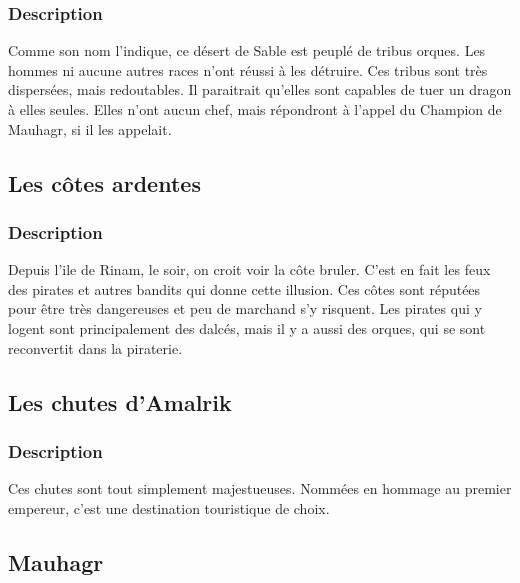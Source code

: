 \subsubsection{Description}
\hypertarget{ledesertorque}{}Comme son nom l'indique, ce désert de Sable est peuplé de tribus orques. 
Les hommes ni aucune autres races n'ont réussi à les détruire.
Ces tribus sont très dispersées, mais redoutables.
Il paraitrait qu'elles sont capables de tuer un dragon à elles seules.
Elles n'ont aucun chef, mais répondront à l'appel du Champion de Mauhagr, si il les appelait. 
\subsection{Les côtes ardentes}
\subsubsection{Description}
\hypertarget{lescotesardentes}{}Depuis l'ile de Rinam, le soir, on croit voir la côte bruler.
C'est en fait les feux des pirates et autres bandits qui donne cette illusion.
Ces côtes sont réputées pour être très dangereuses et peu de marchand s'y risquent. 
Les pirates qui y logent sont principalement des dalcés, mais il y a aussi des orques, qui se sont reconvertit dans la piraterie.
\subsection{Les chutes d'Amalrik}
\subsubsection{Description}
\hypertarget {leschutesdamalrik}{}Ces chutes sont tout simplement majestueuses.
Nommées en hommage au premier empereur, c'est une destination touristique de choix.
\subsection{Mauhagr}
